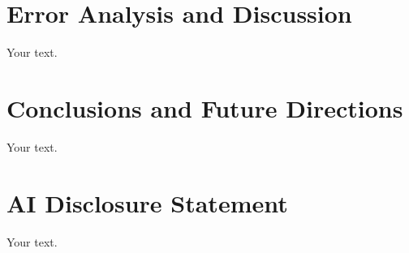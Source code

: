\documentclass{article}
\begin{document}
\section{Error Analysis and Discussion}

Your text.

\section{Conclusions and Future Directions}

Your text.




\appendix

\section{AI Disclosure Statement}

Your text.
\end{document}
